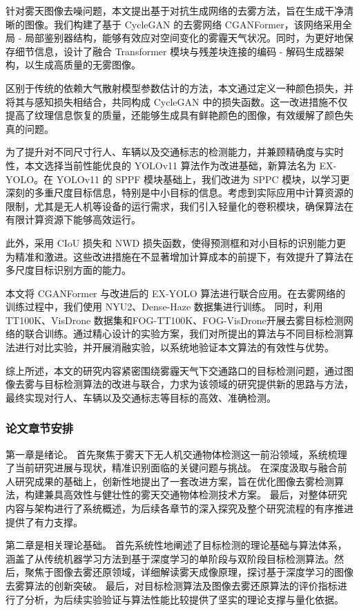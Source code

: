 针对雾天图像去噪问题，本文提出基于对抗生成网络的去雾方法，旨在生成干净清晰的图像。我们构建了基于 CycleGAN \cite{cgan}的去雾网络 CGANFormer，该网络采用全局 - 局部鉴别器结构，能够有效应对空间变化的雾霾天气状况。同时，为更好地保存细节信息，设计了融合 Transformer 模块与残差块连接的编码 - 解码生成器架构，以生成高质量的无雾图像。

区别于传统的依赖大气散射模型参数估计的方法，本文通过定义一种颜色损失，并将其与感知损失相结合，共同构成 CycleGAN 中的损失函数。这一改进措施不仅提高了纹理信息恢复的质量，还能够生成具有鲜艳颜色的图像，有效缓解了颜色失真的问题。

为了提升对不同尺寸行人、车辆以及交通标志的检测能力，并兼顾精确度与实时性，本文选择当前性能优良的 YOLOv11 算法作为改进基础，新算法名为 EX-YOLO。在 YOLOv11 的 SPPF 模块基础上，我们改进为 SPPC 模块，以学习更深刻的多重尺度目标信息，特别是中小目标的信息。考虑到实际应用中计算资源的限制，尤其是无人机等设备的运行需求，我们引入轻量化的卷积模块，确保算法在有限计算资源下能够高效运行。

此外，采用 CIoU 损失和 NWD 损失函数\cite{nwd}，使得预测框和对小目标的识别能力更为精准和激进。这些改进措施在不显著增加计算成本的前提下，有效提升了算法在多尺度目标识别方面的能力。

本文将 CGANFormer 与改进后的 EX-YOLO 算法进行联合应用。在去雾网络的训练过程中，我们使用 NYU2\cite{nyu2}、Dense-Haze\cite{NTIRE_Dehazing_2019} 数据集进行训练。
同时，利用 TT100K\cite{tt100k}、VisDrone\cite{vd} 数据集和FOG-TT100K、FOG-VisDrone开展去雾目标检测网络的联合训练。通过精心设计的实验方案，我们对所提出的算法与不同目标检测算法进行对比实验，并开展消融实验，以系统地验证本文算法的有效性与优势。

综上所述，本文的研究内容紧密围绕雾霾天气下交通路口的目标检测问题，通过图像去雾与目标检测算法的改进与联合，力求为该领域的研究提供新的思路与方法，最终实现对行人、车辆以及交通标志等目标的高效、准确检测。

\subsubsection{论文章节安排}

第一章是绪论。
首先聚焦于雾天下无人机交通物体检测这一前沿领域，系统梳理了当前研究进展与现状，精准识别面临的关键问题与挑战。
在深度汲取与融合前人研究成果的基础上，创新性地提出了一套改进方案，旨在优化图像去雾检测算法，构建兼具高效性与健壮性的雾天交通物体检测技术方案。
最后，对整体研究内容与架构进行了系统概述，为后续各章节的深入探究及整个研究流程的有序推进提供了有力支撑。

第二章是相关理论基础。
首先系统性地阐述了目标检测的理论基础与算法体系，涵盖了从传统机器学习方法到基于深度学习的单阶段与双阶段目标检测算法。然后，聚焦于图像去雾还原领域，详细解读雾天成像原理，探讨基于深度学习的图像去雾算法的创新突破。
最后，对目标检测算法及图像去雾还原算法的评价指标进行了分析，为后续实验验证与算法性能比较提供了坚实的理论支撑与量化依据。

